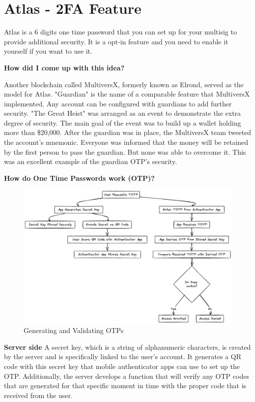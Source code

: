 \section{Atlas - 2FA Feature}
\label{ch4sec2}
Atlas is a 6 digits one time password that you can set up for your multisig to provide additional security. It is a opt-in feature and you need to enable it yourself if you want to use it.
\par \textbf{How did I come up with this idea?}
\par Another blockchain called MultiversX, formerly known as Elrond, served as the model for Atlas. "Guardian" is the name of a comparable feature that MultiversX implemented. Any account can be configured with guardians to add further security. "The Great Heist" was arranged as an event to demonstrate the extra degree of security. The main goal of the event was to build up a wallet holding more than \$20,000. After the guardian was in place, the MultiversX team tweeted the account's mnemonic. Everyone was informed that the money will be retained by the first person to pass the guardian. But none was able to overcome it. This was an excellent example of the guardian OTP's security.
\par\textbf{How do One Time Passwords work (OTP)?}
\begin{figure}[htbp]
	\centering
	\includegraphics[scale=0.35]{./figures/totp.png}
	\caption{Generating and Validating OTPs}
\end{figure}
\par \textbf{Server side} 
A secret key, which is a string of alphanumeric characters, is created by the server and is specifically linked to the user's account. It generates a QR code with this secret key that mobile authenticator apps can use to set up the OTP.  Additionally, the server develops a function that will verify any OTP codes that are generated for that specific moment in time with the proper code that is received from the user.
